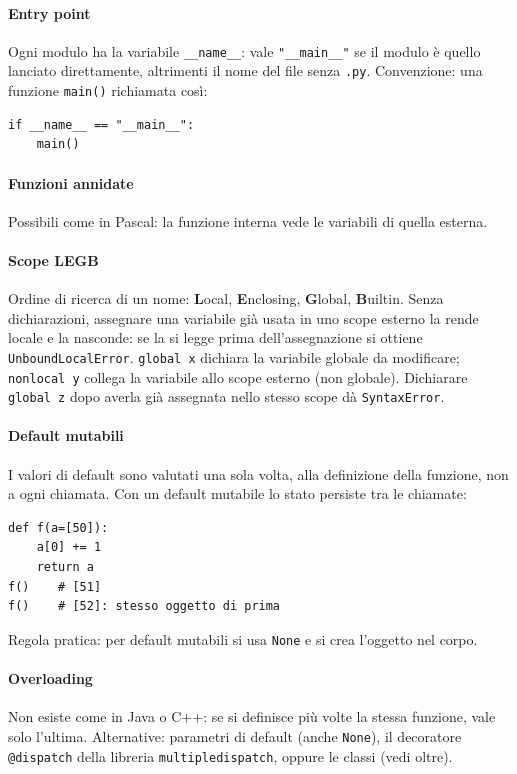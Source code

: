 \documentclass[a4paper,12pt]{article}
\begin{document}
\paragraph{Entry point} Ogni modulo ha la variabile \texttt{\_\_name\_\_}: vale
\texttt{"\_\_main\_\_"} se il modulo è quello lanciato direttamente, altrimenti il nome del
file senza \texttt{.py}. Convenzione: una funzione \texttt{main()} richiamata così:
\begin{verbatim}
if __name__ == "__main__":
    main()
\end{verbatim}

\paragraph{Funzioni annidate} Possibili come in Pascal: la funzione interna vede le
variabili di quella esterna.

\paragraph{Scope LEGB} Ordine di ricerca di un nome: \textbf{L}ocal, \textbf{E}nclosing,
\textbf{G}lobal, \textbf{B}uiltin. Senza dichiarazioni, assegnare una variabile già usata in
uno scope esterno la rende locale e la nasconde: se la si legge prima dell'assegnazione
si ottiene \texttt{UnboundLocalError}. \texttt{global x} dichiara la variabile globale da
modificare; \texttt{nonlocal y} collega la variabile allo scope esterno (non globale).
Dichiarare \texttt{global z} dopo averla già assegnata nello stesso scope dà
\texttt{SyntaxError}.

\paragraph{Default mutabili} I valori di default sono valutati una sola volta, alla
definizione della funzione, non a ogni chiamata. Con un default mutabile lo stato
persiste tra le chiamate:
\begin{verbatim}
def f(a=[50]):
    a[0] += 1
    return a
f()    # [51]
f()    # [52]: stesso oggetto di prima
\end{verbatim}
Regola pratica: per default mutabili si usa \texttt{None} e si crea l'oggetto nel corpo.

\paragraph{Overloading} Non esiste come in Java o C++: se si definisce più volte la stessa
funzione, vale solo l'ultima. Alternative: parametri di default (anche \texttt{None}),
il decoratore \texttt{@dispatch} della libreria \texttt{multipledispatch}, oppure le
classi (vedi oltre).
\end{document}
